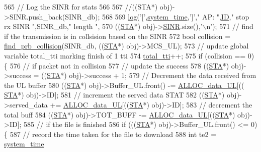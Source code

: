 \begin{DoxyCode}
565         \textcolor{comment}{// Log the SINR for stats}
566         
567         \textcolor{comment}{//((STA*) obj)->SINR.push\_back(SINR\_db);}
568         
569         \hyperlink{AP_8cpp_aa5af53510557e77a03906c5016ebe66f}{log}(\textcolor{charliteral}{'['},\hyperlink{AP_8cpp_aaa03a568dc1d9d3391286ea24b9cfb63}{system\_time},\textcolor{charliteral}{']'},\textcolor{stringliteral}{" AP: "},\hyperlink{classAP_a5f6f67357a37b369b8967ce354ede5dd}{ID},\textcolor{stringliteral}{" stop rx SINR "},SINR\_db,\textcolor{stringliteral}{" length "},
570         ((\hyperlink{classSTA}{STA}*) obj)->\hyperlink{classAP_a462a6a6a0887dae6d6a045015a05c13a}{SINR}.size(),\textcolor{charliteral}{'\(\backslash\)n'});
571         \textcolor{comment}{// find if the transmission is in collsision based on the SINR}
572         \textcolor{keywordtype}{bool} collision = \hyperlink{common_8cpp_a460309c5cf44425cb0495854d0d80967}{find\_prb\_collision}(SINR\_db, ((\hyperlink{classSTA}{STA}*) obj)->MCS\_UL);
573         \textcolor{comment}{// update global variable total\_tti marking finish of 1 tti}
574         \hyperlink{AP_8cpp_a7e2c5000806892db20041b55ceb34dbf}{total\_tti}++;
575         \textcolor{keywordflow}{if} (collision == 0) \{
576             \textcolor{comment}{// if packet not in collision}
577             \textcolor{comment}{// update the success}
578             ((\hyperlink{classSTA}{STA}*) obj)->success = ((\hyperlink{classSTA}{STA}*) obj)->success + 1;
579             \textcolor{comment}{// Decrement the data received from the UL buffer}
580             ((\hyperlink{classSTA}{STA}*) obj)->Buffer\_UL.front() -= \hyperlink{classAP_ae5567916229fb09fbb83af3cfad5d71d}{ALLOC\_data\_UL}[((
      \hyperlink{classSTA}{STA}*) obj)->ID];
581             \textcolor{comment}{// increment the served data STAT}
582             ((\hyperlink{classSTA}{STA}*) obj)->served\_data += \hyperlink{classAP_ae5567916229fb09fbb83af3cfad5d71d}{ALLOC\_data\_UL}[((\hyperlink{classSTA}{STA}*) obj)->ID];
583             \textcolor{comment}{// decrement the total buff}
584             ((\hyperlink{classSTA}{STA}*) obj)->TOT\_BUFF -= \hyperlink{classAP_ae5567916229fb09fbb83af3cfad5d71d}{ALLOC\_data\_UL}[((\hyperlink{classSTA}{STA}*) obj)->ID];
585             \textcolor{comment}{// if the file is finished}
586             \textcolor{keywordflow}{if} (((\hyperlink{classSTA}{STA}*) obj)->Buffer\_UL.front() <= 0) \{
587                 \textcolor{comment}{// record the time taken for the file to download}
588                 \textcolor{keywordtype}{int} te2 = \hyperlink{AP_8cpp_aaa03a568dc1d9d3391286ea24b9cfb63}{system\_time}

\end{DoxyCode}
